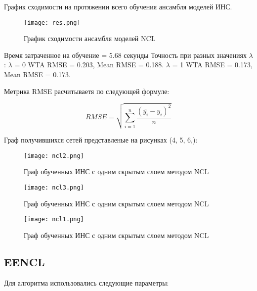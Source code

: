\documentclass[12pt]{extarticle}
\begin{document}
\FloatBarrier %

График сходимости на протяжении всего обучения ансамбля моделей ИНС.

\begin{figure}[H]
    \centering
    \texttt{[image: res.png]} %
    \caption{График сходимости ансамбля моделей NCL}
    \label{fig:example}
\end{figure}

\FloatBarrier %

Время затраченное на обучение = 5.68 секунды  Точность при разных значениях \(\lambda\):  \(\lambda\) = 0 WTA RMSE = 0.203, Mean RMSE = 0.188. \(\lambda\) = 1 WTA RMSE = 0.173, Mean RMSE = 0.173. 

Метрика RMSE расчитываетя по следующей формуле:

\begin{equation} \label{eq:formula4}
 RMSE = \sqrt{\sum_{i=1}^{n}\frac{(\bar{y_i} - y_i)^2}{n}}
\end{equation}

Граф получившихся сетей представленые на рисунках (4, 5, 6,):

\begin{figure}[H]
    \centering
    \texttt{[image: ncl2.png]} %
    \caption{Граф обученных ИНС с одним скрытым слоем методом NCL}
    \label{fig:example}
\end{figure}

\begin{figure}[H]
    \centering
    \texttt{[image: ncl3.png]} %
    \caption{Граф обученных ИНС с одним скрытым слоем методом NCL}
    \label{fig:example}
\end{figure}

\begin{figure}[H]
    \centering
    \texttt{[image: ncl1.png]} %
    \caption{Граф обученных ИНС с одним скрытым слоем методом NCL}
    \label{fig:example}
\end{figure}

\newpage %

\subsection{EENCL}
Для алгоритма использовались следующие параметры:
\end{document}

